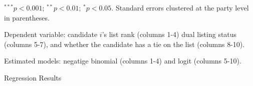 \begin{table}[!htbp]
\begin{center}
{\begin{threeparttable}
\begin{tablenotes}[flushleft]
\scriptsize{\item $^{***}p<0.001$; $^{**}p<0.01$; $^{*}p<0.05$. Standard errors clustered at the party level in parentheses.
\item Dependent variable: candidate $i$'s list rank (columns 1-4) dual listing status (columns 5-7), and whether the candidate has a tie on the list (columns 8-10).
\item Estimated models: negatige binomial (columns 1-4) and logit (columns 5-10).}
\end{tablenotes}
\end{threeparttable}
}
\caption{Regression Results}
\label{tab:regression_results}
\end{center}
\end{table}
